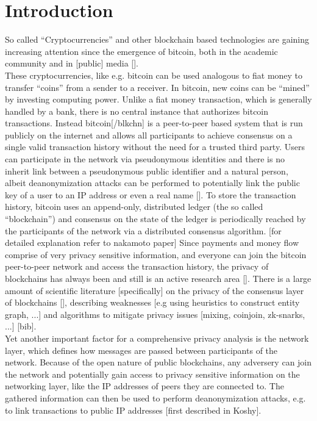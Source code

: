 \section{Introduction}
So called ``Cryptocurrencies'' and other blockchain based technologies are gaining
increasing attention since the emergence of bitcoin, both in the academic community and in [public] media []. \\
These cryptocurrencies, like e.g. bitcoin can be used analogous to fiat money to transfer ``coins''
from a sender to a receiver. In bitcoin, new coins can be ``mined'' by investing computing power.
Unlike a fiat money transaction, which is generally handled by a bank, there is no central instance
that authorizes bitcoin transactions. Instead bitcoin[/blkchn] is a peer-to-peer based system that is run publicly on the internet
and allows all participants to achieve consensus on a single valid transaction history without the need for a trusted third party.
Users can participate in the network via pseudonymous identities and there is no inherit link between a pseudonymous public identifier and a natural person,
albeit deanonymization attacks can be performed to potentially link the public key of a user to an IP address or even a real name [].
To store the transaction history, bitcoin uses an append-only, distributed ledger (the so called ``blockchain'')
and consensus on the state of the ledger is periodically reached
by the participants of the network via a distributed consensus algorithm. [for detailed explanation refer to nakamoto paper]
Since payments and money flow comprise of very privacy sensitive information, and everyone can join the bitcoin peer-to-peer network
and access the transaction history, the privacy of blockchains has always been and still is an active research area [].
There is a large amount of scientific literature [specifically] on the privacy of the consensus layer of
blockchains [], describing weaknesses [e.g using heuristics to construct entity graph, ...] and algorithms to mitigate privacy issues [mixing, coinjoin, zk-snarks, ...] [bib]. \\
Yet another important factor for a comprehensive privacy analysis is the network layer, which
defines how messages are passed between participants of the network.
Because of the open nature of public blockchains, any adversery can join the network and potentially gain access to
privacy sensitive information on the networking layer, like the IP addresses of peers they are connected to.
The gathered information can then be used to perform deanonymization attacks, e.g. to link transactions to public IP addresses [first described in Koshy]. \\
